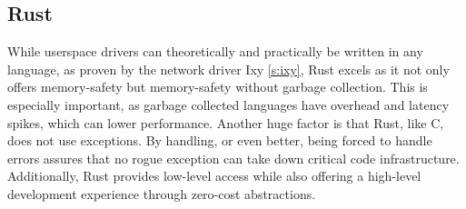 \subsection{Rust}
While userspace drivers can theoretically and practically be written in any language, as proven by the network driver Ixy \autoref{s:ixy}, Rust excels as it not only offers memory-safety but memory-safety without garbage collection. This is especially important, as garbage collected languages have overhead and latency spikes, which can lower performance. Another huge factor is that Rust, like C, does not use exceptions. By handling, or even better, being forced to handle errors assures that no rogue exception can take down critical code infrastructure.
Additionally, Rust provides low-level access while also offering a high-level development experience through zero-cost abstractions.